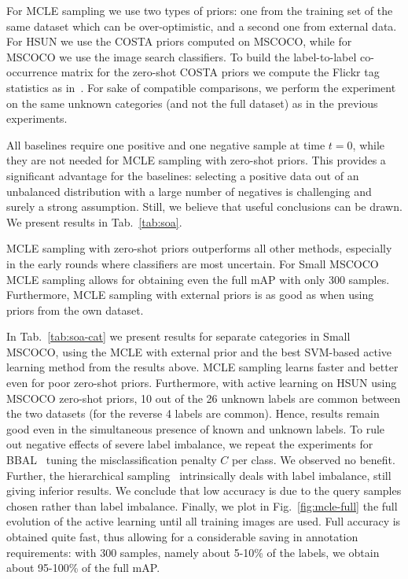 \documentclass[10pt,twocolumn,letterpaper]{article}
\begin{document}
For MCLE sampling we use two types of priors: one from the training set of the same dataset which can be over-optimistic, and a second one from external data.
For HSUN we use the COSTA priors computed on MSCOCO, while for MSCOCO we use the image search classifiers. 
To build the label-to-label co-occurrence matrix for the zero-shot COSTA priors we 
compute the Flickr tag statistics as in~\cite{MensinkCVPR2014}. For sake of compatible comparisons, we perform the experiment on the same unknown categories (and not the full dataset) as in the previous experiments. 


All baselines require one positive and one negative sample 
at time $t = 0$, while they are not needed for MCLE
sampling with zero-shot priors. This provides a significant
advantage for the baselines: selecting a positive data out of
an unbalanced distribution with a large number of negatives
is challenging and surely a strong assumption. Still, we believe that useful conclusions can
be drawn. We present results in Tab.~\ref{tab:soa}.


MCLE sampling with zero-shot priors outperforms all other methods, especially in the early rounds where classifiers are most uncertain.
For Small MSCOCO MCLE sampling allows for obtaining even the full mAP with only 300 samples.
Furthermore, MCLE sampling with external priors is as good as when using priors from the own dataset.

In Tab.~\ref{tab:soa-cat} we present results for separate categories in Small MSCOCO, using the MCLE with external prior and the best SVM-based active learning method from the results above.  MCLE sampling learns faster and better even for poor zero-shot priors.
Furthermore, with active learning on HSUN using MSCOCO zero-shot priors, 10 out of the 26 unknown labels are common between the two datasets (for the reverse 4 labels are common). Hence, results remain good even in the simultaneous presence of known and unknown labels. To rule out negative effects of severe label imbalance, we repeat the experiments for BBAL~\cite{VijayanarasimhanJG10} tuning the misclassification penalty $C$ per class. We observed no benefit. Further, the hierarchical sampling~\cite{Dasgupta} intrinsically deals with label imbalance, still giving inferior results. We conclude that low accuracy is due to the query samples chosen rather than label imbalance.
Finally, we plot in Fig.~\ref{fig:mcle-full} the full evolution of the active learning until all training images are used. Full accuracy is obtained quite fast, thus allowing for a considerable saving in annotation requirements: with 300 samples, namely about 5-10\% of the labels, we obtain about 95-100\% of the full mAP. 
\end{document}
